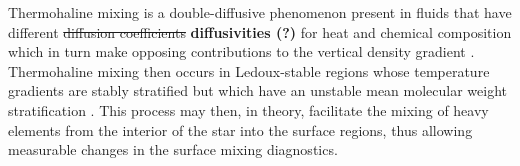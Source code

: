 Thermohaline mixing is a double-diffusive phenomenon present in fluids that have different \sout{diffusion coefficients} \textbf{diffusivities (?)} for heat and chemical composition which in turn make opposing contributions to the vertical density gradient \citep{Turner:1974}. Thermohaline mixing then occurs in Ledoux-stable regions whose temperature gradients are stably stratified but which have an unstable mean molecular weight stratification \citep[see][for a full review]{garaud_DDC_review_2018}. This process may then, in theory, facilitate the mixing of heavy elements from the interior of the star into the surface regions, thus allowing measurable changes in the surface mixing diagnostics.



